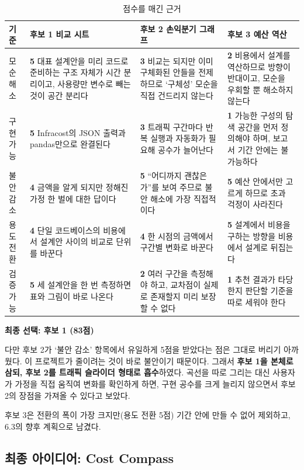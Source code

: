 \documentclass[10pt,a4paper]{article}
\begin{document}
\begin{table}[!h]
\centering
\caption{점수를 매긴 근거}
\label{tab:weightedreason}
\footnotesize
\begin{tabularx}{\textwidth}{l Y Y Y}
\toprule
\textbf{기준} & \textbf{후보 1 비교 시트} & \textbf{후보 2 손익분기 그래프} & \textbf{후보 3 예산 역산} \\
\midrule
모순 해소 & \textbf{5} 대표 설계안을 미리 코드로 준비하는 구조 자체가 시간 분리이고, 사용량만 변수로 빼는 것이 공간 분리다 & \textbf{3} 비교는 되지만 이미 구체화된 안들을 전제하므로 `구체성' 모순을 직접 건드리지 않는다 & \textbf{2} 비용에서 설계를 역산하므로 방향이 반대이고, 모순을 우회할 뿐 해소하지 않는다 \\
구현 가능 & \textbf{5} Infracost의 JSON 출력과 pandas만으로 완결된다 & \textbf{3} 트래픽 구간마다 반복 실행과 자동화가 필요해 공수가 늘어난다 & \textbf{1} 가능한 구성의 탐색 공간을 먼저 정의해야 하며, 보고서 기간 안에는 불가능하다 \\
불안 감소 & \textbf{4} 금액을 알게 되지만 정해진 가정 한 벌에 대한 답이다 & \textbf{5} ``어디까지 괜찮은가''를 보여 주므로 불안 해소에 가장 직접적이다 & \textbf{5} 예산 안에서만 고르게 하므로 초과 걱정이 사라진다 \\
용도 전환 & \textbf{4} 단일 코드베이스의 비용에서 설계안 사이의 비교로 단위를 바꾼다 & \textbf{4} 한 시점의 금액에서 구간별 변화로 바꾼다 & \textbf{5} 설계에서 비용을 구하는 방향을 비용에서 설계로 뒤집는다 \\
검증 가능 & \textbf{5} 세 설계안을 한 번 측정하면 표와 그림이 바로 나온다 & \textbf{2} 여러 구간을 측정해야 하고, 교차점이 실제로 존재할지 미리 보장할 수 없다 & \textbf{1} 추천 결과가 타당한지 판단할 기준을 따로 세워야 한다 \\
\bottomrule
\end{tabularx}
\end{table}

\textbf{최종 선택: 후보 1 (83점)}

다만 후보 2가 `불안 감소' 항목에서 유일하게 5점을 받았다는 점은 그대로 버리기 아까웠다. 이 프로젝트가 줄이려는 것이 바로 불안이기 때문이다. 그래서 \textbf{후보 1을 본체로 삼되, 후보 2를 트래픽 슬라이더 형태로 흡수}하였다. 곡선을 따로 그리는 대신 사용자가 가정을 직접 움직여 변화를 확인하게 하면, 구현 공수를 크게 늘리지 않으면서 후보 2의 장점을 가져올 수 있다고 보았다.

후보 3은 전환의 폭이 가장 크지만(용도 전환 5점) 기간 안에 만들 수 없어 제외하고, 6.3의 향후 계획으로 남겼다.

\subsection{최종 아이디어: Cost Compass}
\end{document}
